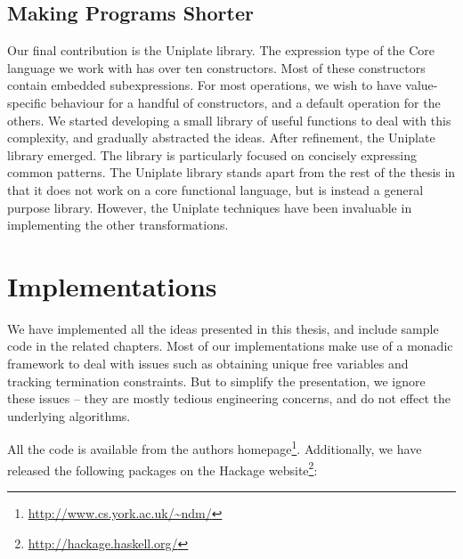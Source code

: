 \subsection{Making Programs Shorter}

Our final contribution is the Uniplate library. The expression type of the Core language we work with has over ten constructors. Most of these constructors contain embedded subexpressions. For most operations, we wish to have value-specific behaviour for a handful of constructors, and a default operation for the others. We started developing a small library of useful functions to deal with this complexity, and gradually abstracted the ideas. After refinement, the Uniplate library emerged. The library is particularly focused on concisely expressing common patterns. The Uniplate library stands apart from the rest of the thesis in that it does not work on a core functional language, but is instead a general purpose library. However, the Uniplate techniques have been invaluable in implementing the other transformations.


\section{Implementations}
\label{secI:implementation}

We have implemented all the ideas presented in this thesis, and include sample code in the related chapters. Most of our implementations make use of a monadic framework to deal with issues such as obtaining unique free variables and tracking termination constraints. But to simplify the presentation, we ignore these issues -- they are mostly tedious engineering concerns, and do not effect the underlying algorithms.

All the code is available from the authors homepage\footnote{\url{http://www.cs.york.ac.uk/~ndm/}}. Additionally, we have released the following packages on the Hackage website\footnote{\url{http://hackage.haskell.org/}}:

